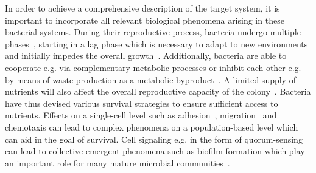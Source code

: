 \documentclass[10pt,twocolumn,5p]{elsarticle}
\numberwithin{equation}{section}
\begin{document}
In order to achieve a comprehensive description of the target system, it is important to incorporate
all relevant biological phenomena arising in these bacterial systems.
During their reproductive process, bacteria undergo multiple phases~\cite{buchanan_when_1997}, starting in a lag phase which
is necessary to adapt to new environments and initially impedes the overall growth~\cite{rolfe_lag_2012, monod_growth_1949}.
Additionally, bacteria are able to cooperate e.g. via complementary metabolic processes or inhibit
each other e.g. by means of waste production as a metabolic byproduct~\cite{west_social_2007, rainey_evolution_2003, hibbing_bacterial_2010, stubbendieck_bacterial_2016}.
A limited supply of nutrients will also affect the overall reproductive capacity of the colony~\cite{monod_growth_1949}.
Bacteria have thus devised various survival strategies to ensure sufficient access to nutrients.
Effects on a single-cell level such as adhesion~\cite{htuson_bacteriasurface_2013}, migration~\cite{decoene_microscopic_2011} and chemotaxis can lead to complex
phenomena on a population-based level which can aid in the goal of survival.
Cell signaling e.g. in the form of quorum-sensing can lead to collective emergent phenomena such as
biofilm formation which play an important role for many mature microbial communities~\cite{Jin2020,ng_bacterial_2009}.

\end{document}
